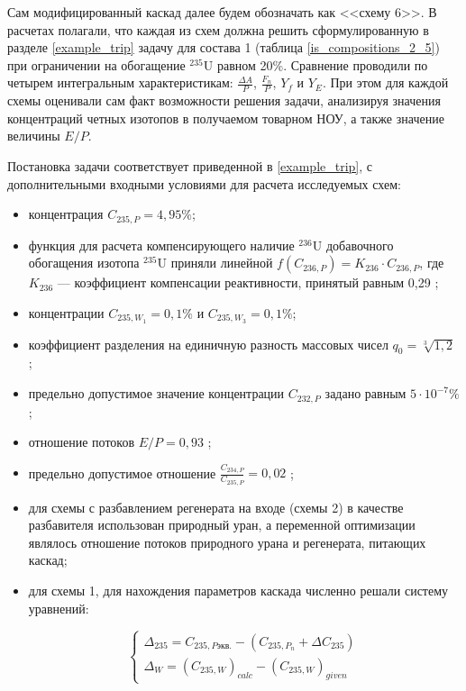 Сам модифицированный каскад далее будем обозначать как <<схему 6>>. В расчетах полагали, что каждая из схем должна решить сформулированную в разделе \ref{example_trip} задачу для состава 1 (таблица \ref{is_compositions_2_5}) при ограничении на обогащение $^{235}$U равном 20\%. Сравнение проводили по четырем интегральным характеристикам: $\frac{\Delta A}{P}$, $\frac{F_n}{P}$, $Y_f$ и $Y_E$. При этом для каждой схемы оценивали сам факт возможности решения задачи, анализируя значения концентраций четных изотопов в получаемом товарном НОУ, а также значение величины $E/P$. 

Постановка задачи соответствует приведенной в \ref{example_trip}, с дополнительными входными условиями для расчета исследуемых схем:

\begin{itemize}
    \item концентрация $C_{235,{P}} = {4,95\%}$; 
    \item функция для расчета компенсирующего наличие $^{236}$U добавочного обогащения изотопа $^{235}$U приняли линейной $f(C_{236,P}) = {K_{236}\cdot{C_{236,{P}}}}$, где $K_{236}$ --- коэффициент компенсации реактивности, принятый равным 0,29 \cite{smirnovEvolutionIsotopicComposition2012};
    \item концентрации $C_{235,{W_1}} = 0,1\%$ и $C_{235,{W_3}} = 0,1\%$;
    \item коэффициент разделения на единичную разность массовых чисел $q_{0} = \sqrt[3]{1,2}$ \cite{smirnovEvolutionIsotopicComposition2012};
    \item предельно допустимое значение концентрации $C_{232,{P}}$ задано равным $5\cdot10^{-7} \%$;
    \item отношение потоков $E/P = 0,93$ \cite{smirnovObogashchenieRegenerirovannogoUrana2018};
    \item предельно допустимое отношение $\frac{C_{234,{P}}}{C_{235,{P}}} = 0,02$ \cite{smirnovObogashchenieRegenerirovannogoUrana2018};
    \item для схемы с разбавлением регенерата на входе (схемы 2) в качестве разбавителя использован природный уран, а переменной оптимизации являлось отношение потоков природного урана и регенерата, питающих каскад;
    \item для схемы 1, для нахождения параметров каскада численно решали систему уравнений:
    
    \begin{equation}\label{snau_sch1}
  \begin{cases}
  \Delta_{235}=C_{235,P\textit{экв.}}-(C_{235,{P_n}}+\Delta C_{235})\\
  \Delta_{W} = {(C_{235, W})}_{calc}-{(C_{235, W})}_{given}
  \end{cases}\,
\end{equation}
    

\end{itemize}
